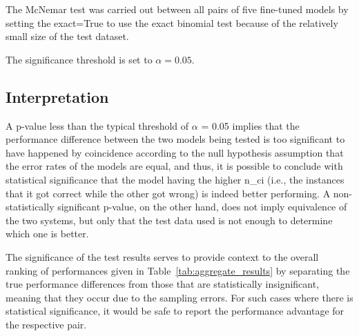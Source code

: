 \documentclass[journal]{IEEEtran}
\begin{document}
The McNemar test was carried out between all pairs of five fine-tuned
models by setting the exact=True to use the exact binomial test because
of the relatively small size of the test dataset.

\begin{table}[htbp]
\caption{McNemar's Test Results for Pairwise Model Significance}
\label{tab:mcnemar_results}
\begin{center}
\end{center}
\end{table}

The significance threshold is set to $\alpha = 0.05$.

\subsection{Interpretation}

A p-value less than the typical threshold of $\alpha$ = 0.05 implies that the performance difference between the two models being tested is too significant to have happened by coincidence according to the null hypothesis assumption that the error rates of the models are equal, and thus, it is possible to conclude with statistical significance that the model having the higher n\_ci (i.e., the instances that it got correct while the other got wrong) is indeed better performing. A non-statistically significant p-value, on the other hand, does not imply equivalence of the two systems, but only that the test data used is not enough to determine which one is better.

The significance of the test results serves to provide context to the overall ranking of performances given in Table~\ref{tab:aggregate_results} by separating the true performance differences from those that are statistically insignificant, meaning that they occur due to the sampling errors. For such cases where there is statistical significance, it would be safe to report the performance advantage for the respective pair.
\end{document}
